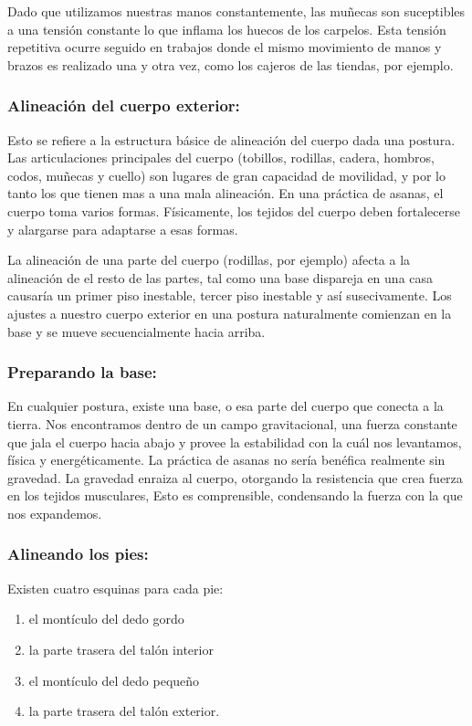 Dado que utilizamos nuestras manos constantemente, las muñecas son suceptibles a una tensión constante lo que inflama los huecos de los carpelos. Esta tensión repetitiva ocurre seguido en trabajos donde el mismo movimiento de manos y brazos es realizado una y otra vez, como los cajeros de las tiendas, por ejemplo.

\subsubsection{Alineación del cuerpo exterior:}
Esto se refiere a la estructura básice de alineación del cuerpo dada una postura. Las articulaciones principales del cuerpo (tobillos, rodillas, cadera, hombros, codos, muñecas y cuello) son lugares de gran capacidad de movilidad, y por lo tanto los que tienen mas a una mala alineación. En una práctica de asanas, el cuerpo toma varios formas. Físicamente, los tejidos del cuerpo deben fortalecerse y alargarse para adaptarse a esas formas.

La alineación de una parte del cuerpo (rodillas, por ejemplo) afecta a la alineación de el resto de las partes, tal como una base dispareja en una casa causaría un primer piso inestable, tercer piso inestable y así susecivamente. Los ajustes a nuestro cuerpo exterior en una postura naturalmente comienzan en la base y se mueve secuencialmente hacia arriba.

\subsubsection{Preparando la base:}
En cualquier postura, existe una base, o esa parte del cuerpo que conecta a la tierra. Nos encontramos dentro de un campo gravitacional, una fuerza constante que jala el cuerpo hacia abajo y provee la estabilidad con la cuál nos levantamos, física y energéticamente. La práctica de asanas no sería benéfica realmente sin gravedad. La gravedad enraiza al cuerpo, otorgando la resistencia que crea fuerza en los tejidos musculares, Esto es comprensible, condensando la fuerza con la que nos expandemos.

\subsubsection{Alineando los pies:}
Existen cuatro esquinas para cada pie:
\begin{enumerate}
	\item el montículo del dedo gordo
	\item la parte trasera del talón interior
	\item el montículo del dedo pequeño
	\item la parte trasera del talón exterior.
\end{enumerate}

